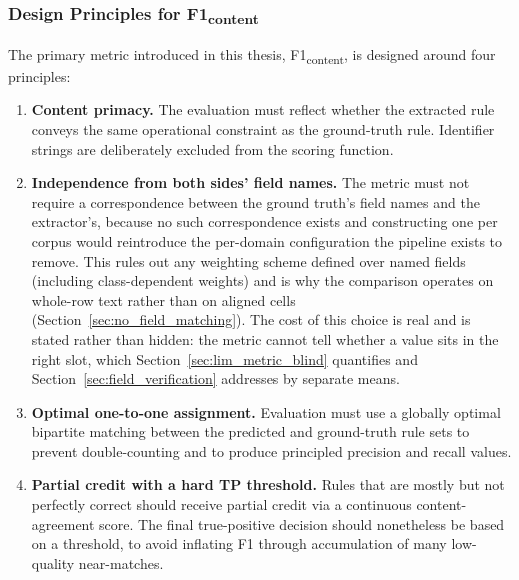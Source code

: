 \documentclass[11pt]{article}
\begin{document}
\subsubsection{Design Principles for F1\textsubscript{content}}
\label{sec:f1content_rationale}

The primary metric introduced in this thesis, F1\textsubscript{content}, is
designed around four principles:

\begin{enumerate}
    \item \textbf{Content primacy.}
          The evaluation must reflect whether the extracted rule conveys the
          same operational constraint as the ground-truth rule.
          Identifier strings are deliberately excluded from the scoring function.

    \item \textbf{Independence from both sides' field names.}
          The metric must not require a correspondence between the ground
          truth's field names and the extractor's, because no such
          correspondence exists and constructing one per corpus would
          reintroduce the per-domain configuration the pipeline exists to
          remove. This rules out any weighting scheme defined over named fields (including class-dependent weights) and is why the comparison
          operates on whole-row text rather than on aligned cells
          (Section~\ref{sec:no_field_matching}). The cost of this choice is
          real and is stated rather than hidden: the metric cannot tell whether
          a value sits in the right slot, which
          Section~\ref{sec:lim_metric_blind} quantifies and
          Section~\ref{sec:field_verification} addresses by separate means.

    \item \textbf{Optimal one-to-one assignment.}
          Evaluation must use a globally optimal bipartite matching between the
          predicted and ground-truth rule sets to prevent double-counting and
          to produce principled precision and recall values.

    \item \textbf{Partial credit with a hard TP threshold.}
          Rules that are mostly but not perfectly correct should receive partial
          credit via a continuous content-agreement score.
          The final true-positive decision should nonetheless be based on a
          threshold, to avoid inflating F1 through accumulation of many
          low-quality near-matches.
\end{enumerate}
\end{document}
